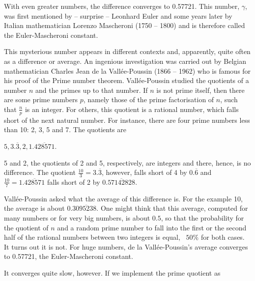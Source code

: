 \documentclass[tikz]{scrreprt}
\begin{document}
With even greater numbers, the difference converges to \num{0.57721}.
This number, $\gamma$, was first mentioned by -- surprise -- 
Leonhard Euler and some years later 
by Italian mathematician Lorenzo Mascheroni (1750 -- 1800) and
is therefore called the Euler-Mascheroni constant.

This mysterious number appears in different contexts and, apparently,
quite often as a difference or average.
An ingenious investigation was carried out by Belgian mathematician
Charles Jean de la Vallée-Poussin (1866 -- 1962) who is famous
for his proof of the Prime number theorem.
Vallée-Poussin studied the quotients of a number $n$ 
and the primes up to that number. If $n$ is not prime itself,
then there are some prime numbers $p$, 
namely those of the prime factorisation of $n$,
such that $\frac{n}{p}$ is an integer. 
For others, this quotient is a rational number,
which falls short of the next natural number.
For instance, there are four prime numbers less than 10:
2, 3, 5 and 7. The quotients are

$5, 3.\overline{3}, 2, 1.\overline{428571}$.

5 and 2, the quotients of 2 and 5, respectively,
are integers and there, hence, is no difference.
The quotient $\frac{10}{3} = 3.\overline{3}$, however,
falls short of 4 by $0.\overline{6}$ and
$\frac{10}{7} = 1.\overline{428571}$ falls short of 2 by
$0.\overline{57142828}$.

Vallée-Poussin asked what the average of this difference is.
For the example 10, the average is about
$0.3\overline{095238}$. 
One might think that this average, computed for many numbers
or for very big numbers, is about $0.5$, so that the probability
for the quotient of $n$ and a random prime number 
to fall into the first or the second half of the rational numbers
between two integers is equal, \ie\ $50\%$ for both cases.
It turns out it is not.
For huge numbers, de la Vallée-Poussin's average converges
to \num{0.57721}, the Euler-Mascheroni constant.

It converges quite slow, however.
If we implement the prime quotient as
\end{document}
